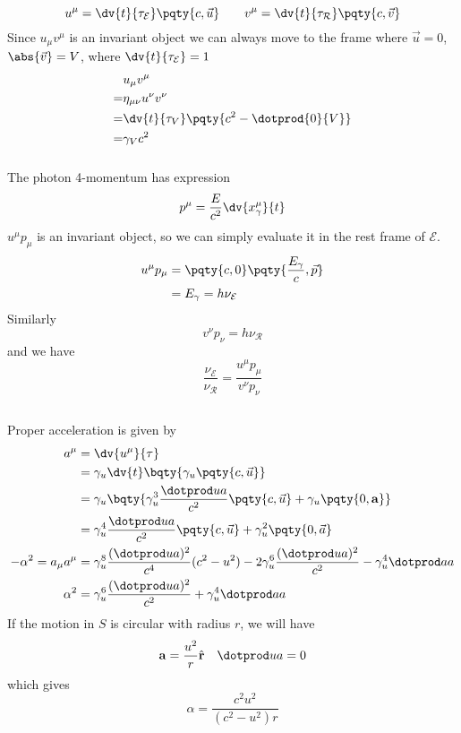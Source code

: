 \documentclass[12pt]{article}
\begin{document}
    \subsection{} \subsubsection{} { \begin{equation*}
        u^\mu = \dv{t}{\tau_{\mathcal E} } \pqty{c,\vec{u}}
        \qquad v^\mu = \dv{t}{\tau_\mathcal{R}} \pqty{c,\vec{v}}
    \end{equation*}}
    Since \(u_\mu v^\mu \) is an invariant object we can always move to the frame where \(\vec{u} = 0\), \(\abs{\vec{v} }= V\), where \(\dv{t}{\tau_\mathcal{E}} = 1\)
    \begin{align*}
        & u_\mu v^\mu \\
        =& \eta_{\mu \nu}u^\nu v^\nu\\
        =& \dv{t}{\tau_V} \pqty{c^2 - \dotprod{0}{V}}\\
        =& \gamma_V c^2
    \end{align*}
    \subsubsection{} The photon 4-momentum has expression \[
        p^\mu = \frac{E}{c^2} \dv{x_\gamma^\mu }{t}
    \]
    \(u^\mu p_\mu\) is an invariant object, so we can simply evaluate it in the rest frame of \(\mathcal{E}\). \begin{align*}
        u^\mu p_\mu &=\pqty{c,0} \pqty{\frac{E_\gamma}{c},\vec{p}}\\
        &= E_\gamma = h \nu_{\mathcal{E}}
    \end{align*}
    Similarly \[
        v^\nu p_\nu = h \nu_{\mathcal{R}}
    \]
    and we have \[
        \frac{\nu_{\mathcal{E}}}{\nu_{\mathcal{R}}} = \frac{u^\mu p_\mu}{v^\nu p_\nu}
    \]
    \subsection{} Proper acceleration is given by 
    \begin{align*}
        a^\mu &= \dv{u^\mu}{\tau}\\
        &= \gamma_u \dv{t}\bqty{\gamma_u\pqty{c,\vec{u}}}\\
        &= \gamma_u \bqty{\gamma^3_u \frac{\dotprod ua}{c^2}\pqty{c,\vec{u}} + \gamma_u \pqty{0, \bf{a}}}\\
        &= \gamma_u^4 \frac{\dotprod u a}{c^2} \pqty{c,\vec{u}} + \gamma_u^2\pqty{0,\vec a}\\
        -\alpha^2 = a_\mu a^\mu &= \gamma_u^8 \frac{(\dotprod u a)^2}{c^4} (c^2 - u^2) - 2\gamma_u^6 \frac{(\dotprod ua)^2}{c^2} - \gamma_u^4 \dotprod aa\\
        \alpha^2  &= \gamma_u^6 \frac{(\dotprod ua)^2}{c^2} +\gamma_u^4 \dotprod aa
    \end{align*}
    If the motion in \(S\) is circular with radius \(r\), we will have \begin{align*}
        \bf a &= \frac{u^2}{r} \hat{\bf r} & \dotprod ua = 0
    \end{align*}
    which gives \[
        \alpha = \frac{c^2u^2}{(c^2 - u^2)r}
    \]
\newpage
\end{document}
